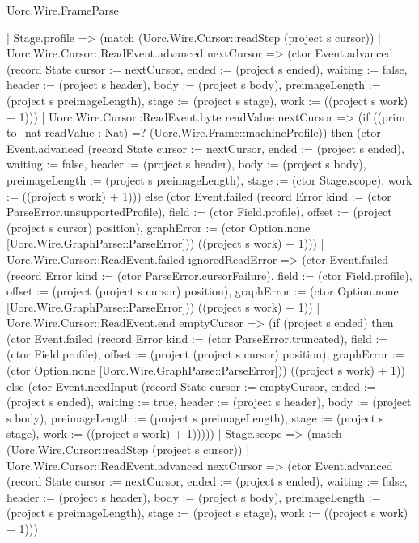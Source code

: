 \begin{lexlean}{Uorc.Wire.FrameParse}
\begin{semanticmodule}
{    | Stage.profile => (match (Uorc.Wire.Cursor::readStep (project s cursor))
      | Uorc.Wire.Cursor::ReadEvent.advanced nextCursor => (ctor Event.advanced (record State {cursor := nextCursor, ended := (project s ended), waiting := false, header := (project s header), body := (project s body), preimageLength := (project s preimageLength), stage := (project s stage), work := ((project s work) + 1)}))
      | Uorc.Wire.Cursor::ReadEvent.byte readValue nextCursor => (if ((prim to_nat readValue : Nat) =? (Uorc.Wire.Frame::machineProfile)) then (ctor Event.advanced (record State {cursor := nextCursor, ended := (project s ended), waiting := false, header := (project s header), body := (project s body), preimageLength := (project s preimageLength), stage := (ctor Stage.scope), work := ((project s work) + 1)})) else (ctor Event.failed (record Error {kind := (ctor ParseError.unsupportedProfile), field := (ctor Field.profile), offset := (project (project s cursor) position), graphError := (ctor Option.none [Uorc.Wire.GraphParse::ParseError])}) ((project s work) + 1)))
      | Uorc.Wire.Cursor::ReadEvent.failed ignoredReadError => (ctor Event.failed (record Error {kind := (ctor ParseError.cursorFailure), field := (ctor Field.profile), offset := (project (project s cursor) position), graphError := (ctor Option.none [Uorc.Wire.GraphParse::ParseError])}) ((project s work) + 1))
      | Uorc.Wire.Cursor::ReadEvent.end emptyCursor => (if (project s ended) then (ctor Event.failed (record Error {kind := (ctor ParseError.truncated), field := (ctor Field.profile), offset := (project (project s cursor) position), graphError := (ctor Option.none [Uorc.Wire.GraphParse::ParseError])}) ((project s work) + 1)) else (ctor Event.needInput (record State {cursor := emptyCursor, ended := (project s ended), waiting := true, header := (project s header), body := (project s body), preimageLength := (project s preimageLength), stage := (project s stage), work := ((project s work) + 1)}))))
    | Stage.scope => (match (Uorc.Wire.Cursor::readStep (project s cursor))
      | Uorc.Wire.Cursor::ReadEvent.advanced nextCursor => (ctor Event.advanced (record State {cursor := nextCursor, ended := (project s ended), waiting := false, header := (project s header), body := (project s body), preimageLength := (project s preimageLength), stage := (project s stage), work := ((project s work) + 1)}))
}
\end{semanticmodule}
\end{lexlean}
